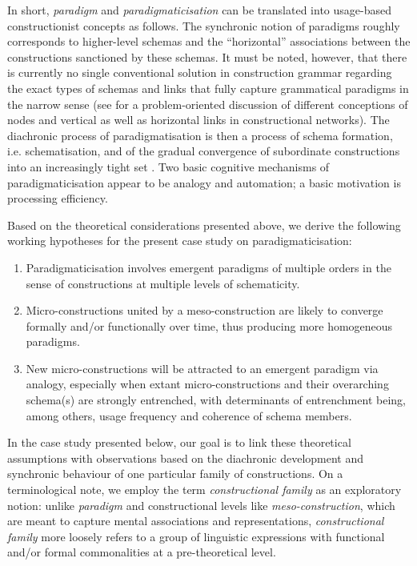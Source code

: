 \documentclass[output=paper]{langsci/langscibook}
\begin{document}
In short, \textit{paradigm} and \textit{paradigmaticisation} can be translated into usage-based constructionist concepts as follows. The synchronic notion of paradigms roughly corresponds to higher-level schemas and the “horizontal” associations between the constructions sanctioned by these schemas. It must be noted, however, that there is currently no single conventional solution in construction grammar regarding the exact types of schemas and links that fully capture grammatical paradigms in the narrow sense (see \citealt{SmirnovaSommererIntroduction2020} for a problem-oriented discussion of different conceptions of nodes and vertical as well as horizontal links in constructional networks). The diachronic process of paradigmatisation is then a process of schema formation, i.e. schematisation, and of the gradual convergence of subordinate constructions into an increasingly tight set \citep[cf.][]{DiewaldParadigmaticintegration2012}. Two basic cognitive mechanisms of paradigmaticisation appear to be analogy and automation; a basic motivation is processing efficiency. 

Based on the theoretical considerations presented above, we derive the following working hypotheses for the present case study on paradigmaticisation: 

\begin{enumerate}[label=(\roman*)]\sloppy
    \item Paradigmaticisation involves emergent paradigms of multiple orders in the sense of constructions at multiple levels of schematicity. 
    \item Micro\hyp{}constructions united by a meso-construction are likely to converge formally and/or functionally over time, thus producing more homogeneous paradigms. 
    \item New micro\hyp{}constructions will be attracted to an emergent paradigm via analogy, especially when extant micro\hyp{}constructions and their overarching schema(s) are strongly entrenched, with determinants of entrenchment being, among others, usage frequency and coherence of schema members. 
\end{enumerate}

In the case study presented below, our goal is to link these theoretical assumptions with observations based on the diachronic development and synchronic behaviour of one particular family of constructions. On a terminological note, we employ the term \textit{constructional family} as an exploratory notion: unlike \textit{paradigm} and constructional levels like \textit{meso-construction}, which are meant to capture mental associations and representations, \textit{constructional family} more loosely refers to a group of linguistic expressions with functional and/or formal commonalities at a pre-theoretical level.
\end{document}
